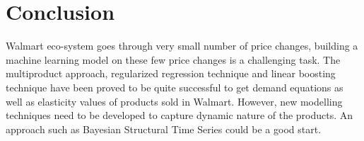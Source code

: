 \section{Conclusion}
\label{sec:conclusion}
Walmart eco-system goes through very small number of price changes, building a machine learning model on these few 
price changes is a challenging task. The multiproduct approach, regularized regression technique and linear boosting 
technique have been proved to be quite successful to get demand equations as well as elasticity values of products sold 
in Walmart. However, new modelling techniques need to be developed to capture dynamic nature of the products. An approach 
such as Bayesian Structural Time Series could be a good start.
 

